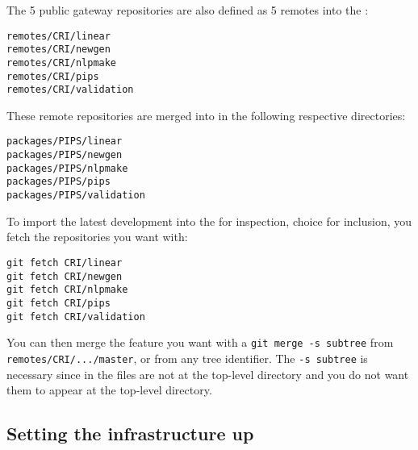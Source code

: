 \documentclass[a4paper]{article}
\begin{document}
The 5 public gateway \Agit repositories are also defined as 5 remotes into
the \Apfa{} \Agit:
\begin{description}
\item[\texttt{remotes/CRI/linear}]
\item[\texttt{remotes/CRI/newgen}]
\item[\texttt{remotes/CRI/nlpmake}]
\item[\texttt{remotes/CRI/pips}]
\item[\texttt{remotes/CRI/validation}]
\end{description}

These remote repositories are merged into \Apfa in the following
respective directories:
\begin{description}
\item[\texttt{packages/PIPS/linear}]
\item[\texttt{packages/PIPS/newgen}]
\item[\texttt{packages/PIPS/nlpmake}]
\item[\texttt{packages/PIPS/pips}]
\item[\texttt{packages/PIPS/validation}]
\end{description}

To import the latest \Apips development into the \Apfa{} \Agit for
inspection, choice for inclusion, you fetch the repositories you want
with:
\begin{verbatim}
git fetch CRI/linear
git fetch CRI/newgen
git fetch CRI/nlpmake
git fetch CRI/pips
git fetch CRI/validation
\end{verbatim}

You can then merge the feature you want with a \texttt{git merge -s
  subtree} from \texttt{remotes/CRI/.../master}, or from any tree
identifier. The \texttt{-s subtree} is necessary since in \Apfa the \Apips
files are not at the top-level directory and you do not want them to
appear at the top-level directory.


\subsection{Setting the infrastructure up}
\label{sec:setup}
\end{document}
